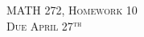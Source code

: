 \documentclass[12pt]{article} %
\begin{document}
\begin{center}
   \textsc{\large MATH 272, Homework 10}\\
   \textsc{Due April 27$^\textrm{th}$}
\end{center}
\vspace{.5cm}
\end{document}
